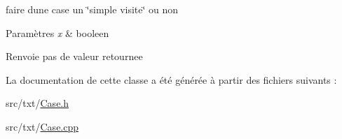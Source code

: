 faire d\textquotesingle{}une case un \char`\"{}simple visite\char`\"{} ou non 


\begin{DoxyParams}{Paramètres}
{\em x} & booleen \\
\hline
\end{DoxyParams}
\begin{DoxyReturn}{Renvoie}
pas de valeur retournee 
\end{DoxyReturn}


La documentation de cette classe a été générée à partir des fichiers suivants \+:\begin{DoxyCompactItemize}
\item 
src/txt/\hyperlink{Case_8h}{Case.\+h}\item 
src/txt/\hyperlink{Case_8cpp}{Case.\+cpp}\end{DoxyCompactItemize}
